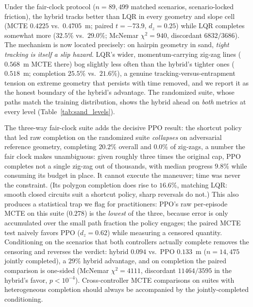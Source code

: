 \documentclass[conference]{IEEEtran}
\begin{document}
Under the fair-clock protocol ($n = 89{,}499$ matched scenarios, scenario-locked friction), the hybrid tracks better than LQR in every geometry and slope cell (MCTE $0.4225$ vs.\ $0.4705$~m; paired $t = -73.9$, $d_z = 0.25$) while LQR completes somewhat more ($32.5\%$ vs.\ $29.0\%$; McNemar $\chi^2 = 940$, discordant $6832/3686$). The mechanism is now located precisely: on hairpin geometry in sand, \emph{tight tracking is itself a slip hazard}. LQR's wider, momentum-carrying zig-zag lines ($0.568$~m MCTE there) bog slightly less often than the hybrid's tighter ones ($0.518$~m; completion $25.5\%$ vs.\ $21.6\%$), a genuine tracking-versus-entrapment tension on extreme geometry that persists with time removed, and we report it as the honest boundary of the hybrid's advantage. The randomized suite, whose paths match the training distribution, shows the hybrid ahead on \emph{both} metrics at every level (Table~\ref{tab:sand_levels}).

The three-way fair-clock suite adds the decisive PPO result: the shortcut policy that led raw completion on the randomized suite \emph{collapses} on adversarial reference geometry, completing $20.2\%$ overall and $0.0\%$ of zig-zags, a number the fair clock makes unambiguous: given roughly three times the original cap, PPO completes not a single zig-zag out of thousands, with median progress $9.8\%$ while consuming its budget in place. It cannot execute the maneuver; time was never the constraint. (Its polygon completion does rise to $16.6\%$, matching LQR: smooth closed circuits suit a shortcut policy, sharp reversals do not.) This also produces a statistical trap we flag for practitioners: PPO's raw per-episode MCTE on this suite ($0.278$) is the \emph{lowest} of the three, because error is only accumulated over the small path fraction the policy engages; the paired MCTE test naively favors PPO ($d_z = 0.62$) while measuring a censored quantity. Conditioning on the scenarios that both controllers actually complete removes the censoring and reverses the verdict: hybrid $0.094$ vs.\ PPO $0.133$~m ($n = 14{,}475$ jointly completed), a $29\%$ hybrid advantage, and on completion the paired comparison is one-sided (McNemar $\chi^2 = 4111$, discordant $11464/3595$ in the hybrid's favor, $p < 10^{-4}$). Cross-controller MCTE comparisons on suites with heterogeneous completion should always be accompanied by the jointly-completed conditioning.
\end{document}
